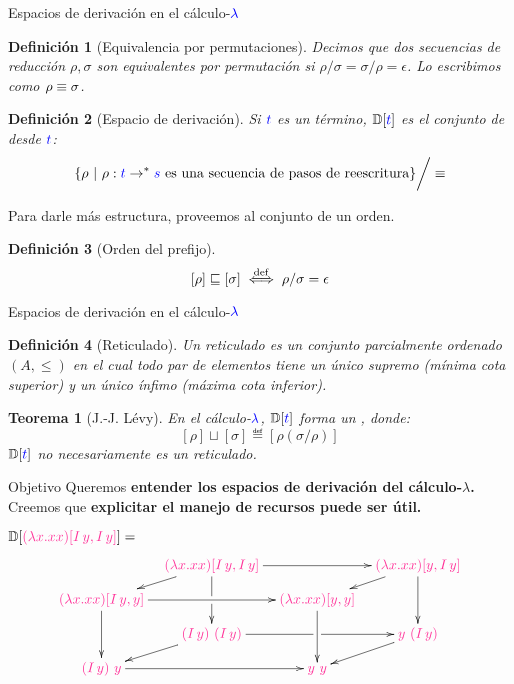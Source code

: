 \documentclass{beamer}
\newtheorem{defes}{Definición}
\newtheorem{teoes}{Teorema}
\newcommand{\cLam}[1]{{\color{darkBlue} #1}}
\newcommand{\cProto}[1]{{\color{lightBlue} #1}}
\newcommand{\clambda}{\cLam{\lambda}}
\begin{document}
\begin{frame}{Espacios de derivación en el cálculo-$\clambda$}

\begin{defes}[Equivalencia por permutaciones]
Decimos que dos secuencias de reducción $\rho, \sigma$ son equivalentes por permutación si $\rho/\sigma = \sigma/\rho = \epsilon$.
Lo escribimos como $\rho \equiv \sigma$.
\end{defes}

\begin{defes}[Espacio de derivación]
Si $\cLam{\tm}$ es un término, $\ulbDeriv{\cLam{\tm}}$ es el conjunto de
 desde $\cLam{\tm}$:
\[
  \set{\rho \ | \ \rho : \cLam{t} \to^* \cLam{s} \text{ es una secuencia de pasos de reescritura}} \bigg/ \permeq
\]
\end{defes}

Para darle más estructura, proveemos al conjunto de un orden.

\begin{defes}[Orden del prefijo]
\[[\rho] \sqsubseteq [\sigma]   \overset{\mathrm{def}}{\iff} \rho / \sigma = \epsilon\]
\end{defes}
\end{frame}

\begin{frame}{Espacios de derivación en el cálculo-$\clambda$}

\begin{defes}[Reticulado]
Un reticulado es un conjunto parcialmente ordenado $(A, \leq)$ en el cual
todo par de elementos tiene un único supremo (mínima cota superior)
y un único ínfimo (máxima cota inferior).
\end{defes}

\vskip 0.5cm

\begin{teoes}[J.-J. Lévy]
En el cálculo-$\clambda$, $\ulbDeriv{\cLam{t}}$ forma un ,
donde:
\[[\rho] \sqcup [\sigma] \eqdef [\rho (\sigma / \rho)] \]
\noindent $\ulbDeriv{\cLam{t}}$ no necesariamente es un reticulado.
\end{teoes}

\end{frame}


\begin{frame}{Objetivo}
Queremos \textbf{entender los espacios de derivación del cálculo-$\lambda$.}
\vskip 0.2cm
Creemos que \textbf{explicitar el manejo de recursos puede ser útil.}
\vskip 0.5cm

$\ulbDeriv{\cProto{(\lam{x}{x x}) [I\, y, I\, y]}} = $
\[\xymatrix@=0.3cm{
& \cProto{(\lam{x}{x x}) [I\, y, I\, y]} \ar[rr] \ar[dd]|!{[d]}\hole \ar[dl]
& & \cProto{(\lam{x}{x x}) [y, I\, y]} \ar[dd] \ar[dl]
\\
\cProto{(\lam{x}{x x}) [I\, y, y]} \ar[rr]\ar[dd]
& & \cProto{(\lam{x}{x x}) [y, y]} \ar[dd]
\\
& \cProto{(I\, y)\ (I\, y)} \ar[rr]|!{[r]}\hole \ar[dl]
& & \cProto{y\ (I\, y)} \ar[dl]
\\
\cProto{(I\, y)\ y} \ar[rr]
& & \cProto{y\ y}
}\]
\end{frame}
\end{document}
